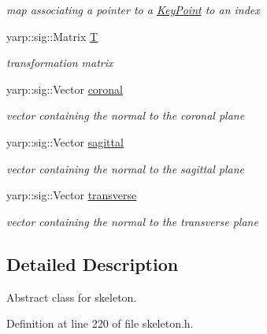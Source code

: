 \begin{DoxyCompactItemize}
\begin{DoxyCompactList}\small\item\em map associating a pointer to a \hyperlink{classassistive__rehab_1_1KeyPoint}{Key\+Point} to an index \end{DoxyCompactList}\item 
\mbox{\label{classassistive__rehab_1_1Skeleton_a358a1c5eb23a562f8558ff8d43583ef7}} 
yarp\+::sig\+::\+Matrix \hyperlink{classassistive__rehab_1_1Skeleton_a358a1c5eb23a562f8558ff8d43583ef7}{T}
\begin{DoxyCompactList}\small\item\em transformation matrix \end{DoxyCompactList}\item 
\mbox{\label{classassistive__rehab_1_1Skeleton_ad042a7e60e6d72cc87b06c5fb0bdfae2}} 
yarp\+::sig\+::\+Vector \hyperlink{classassistive__rehab_1_1Skeleton_ad042a7e60e6d72cc87b06c5fb0bdfae2}{coronal}
\begin{DoxyCompactList}\small\item\em vector containing the normal to the coronal plane \end{DoxyCompactList}\item 
\mbox{\label{classassistive__rehab_1_1Skeleton_a72d6ccb619619e77a17258b08496a972}} 
yarp\+::sig\+::\+Vector \hyperlink{classassistive__rehab_1_1Skeleton_a72d6ccb619619e77a17258b08496a972}{sagittal}
\begin{DoxyCompactList}\small\item\em vector containing the normal to the sagittal plane \end{DoxyCompactList}\item 
\mbox{\label{classassistive__rehab_1_1Skeleton_ab8a9bf9297f520e8de801248e0b8d2dd}} 
yarp\+::sig\+::\+Vector \hyperlink{classassistive__rehab_1_1Skeleton_ab8a9bf9297f520e8de801248e0b8d2dd}{transverse}
\begin{DoxyCompactList}\small\item\em vector containing the normal to the transverse plane \end{DoxyCompactList}\end{DoxyCompactItemize}


\subsection{Detailed Description}
Abstract class for skeleton. 

Definition at line 220 of file skeleton.\+h.



